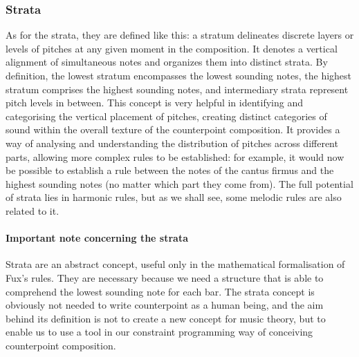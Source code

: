 \subsubsection{Strata}
As for the strata, they are defined like this: a stratum delineates discrete layers or levels of pitches at any given moment in the composition. It denotes a vertical alignment of simultaneous notes and organizes them into distinct strata. By definition, the lowest stratum encompasses the lowest sounding notes, the highest stratum comprises the highest sounding notes, and intermediary strata represent pitch levels in between.
This concept is very helpful in identifying and categorising the vertical placement of pitches, creating distinct categories of sound within the overall texture of the counterpoint composition. It provides a way of analysing and understanding the distribution of pitches across different parts, allowing more complex rules to be established: for example, it would now be possible to establish a rule between the notes of the cantus firmus and the highest sounding notes (no matter which part they come from). The full potential of strata lies in harmonic rules, but as we shall see, some melodic rules are also related to it.

\paragraph*{Important note concerning the strata}
Strata are an abstract concept, useful only in the mathematical formalisation of Fux's rules. They are necessary because we need a structure that is able to comprehend the lowest sounding note for each bar. The strata concept is obviously not needed to write counterpoint as a human being, and the aim behind its definition is not to create a new concept for music theory, but to enable us to use a tool in our constraint programming way of conceiving counterpoint composition.

